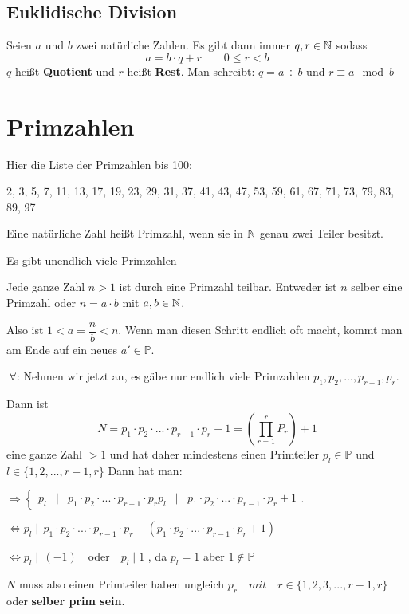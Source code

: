 \documentclass[main.tex]{subfiles}
\begin{document}
\subsection{Euklidische Division}

\begin{Definition}
	Seien $a$ und $b$ zwei natürliche Zahlen. Es gibt dann immer $q,r \in \mathbb{N}$ sodass
	$$a= b\cdot q + r \qquad 0\leq r < b$$
	$q$ heißt \textbf{Quotient} und $r$  heißt \textbf{Rest}.
	Man schreibt: \qquad $q=a \div b$ \qquad und \qquad $r \equiv a \mod b$
\end{Definition}


\section{Primzahlen}

Hier die Liste der Primzahlen bis 100:

2, 3, 5, 7, 11, 13, 17, 19, 23, 29, 31, 37, 41, 43, 47, 53, 59, 61, 67, 71, 73, 79, 83, 89, 97

\begin{Definition}
	Eine natürliche Zahl heißt Primzahl, wenn sie in $\mathbb{N}$ genau zwei Teiler besitzt.
\end{Definition}


\begin{Theorem}
	Es gibt unendlich viele Primzahlen
\end{Theorem}


\begin{Beweis}
	Jede ganze Zahl $n>1$ ist durch eine Primzahl teilbar. Entweder ist $n$ selber eine Primzahl oder $n=a\cdot b$ mit $a,b\in\mathbb{N}$.
	
	Also ist $1<a=\dfrac{n}{b}<n$. Wenn man diesen Schritt endlich oft macht, kommt man am Ende auf ein neues $a'\in\mathbb{P}$.
	
	$\;\forall$: Nehmen wir jetzt an, es gäbe nur endlich viele Primzahlen $p_{1},p_{2},...,p_{r-1},p_{r}$.
	
	Dann ist $$N=p_{1}\cdot p_{2}\cdot ... \cdot p_{r-1} \cdot p_{r} +1 = \left (\prod_{r=1}^{r}P_{r}\right ) + 1 $$ eine ganze Zahl $>1$ und hat daher mindestens einen Primteiler $p_{l} \in\mathbb{P}$ und $l\in\{1,2,...,r-1,r\}$
	Dann hat man:

	$\Rightarrow \left \{ \begin{array}{rccl}
		p_{l} & \mid  & p_{1}\cdot p_{2}\cdot...\cdot p_{r-1}\cdot p_{r}
		p_{l} & \mid  & p_{1}\cdot p_{2}\cdot...\cdot p_{r-1}\cdot p_{r} +1
	\end{array} \right .$.

	$\Leftrightarrow p_{l} \mid  \, p_{1}\cdot p_{2} \cdot...\cdot p_{r-1} \cdot p_{r} - \left (  p_{1}\cdot p_{2} \cdot...\cdot p_{r-1} \cdot p_{r} +1 \right )$
	
	$\Leftrightarrow p_{l} \mid  \, (-1) \quad $oder$ \quad p_{l} \mid  1$ \qquad  \lightning, da $p_{l}=1$ aber $1\notin \mathbb{P}$

	$N$ muss also einen Primteiler haben ungleich $p_{r} \quad mit \quad r\in\{1,2,3,...,r-1,r\}$ oder \textbf{selber prim sein}.
\end{Beweis}
\end{document}
